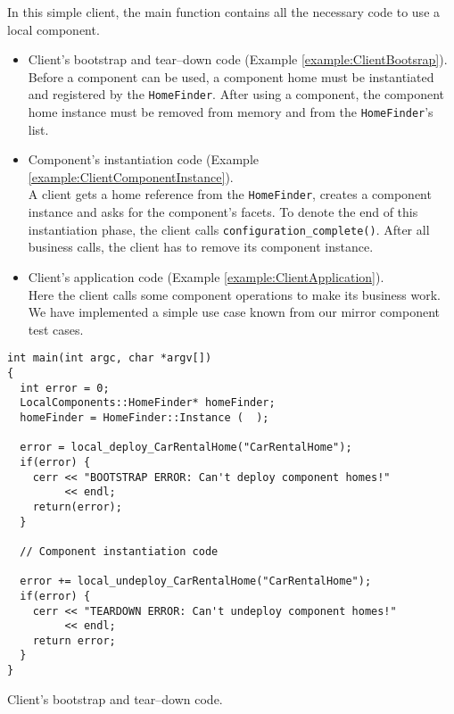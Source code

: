 In this simple client, the main function contains all the necessary code to use
a local component. 
\begin{itemize}
\item Client's bootstrap and tear--down code (Example \ref{example:ClientBootsrap}).\\
Before a component can be used, a component home must be instantiated and registered
by the {\tt HomeFinder}.
After using a component, the component home instance must be removed from memory and
from the {\tt HomeFinder}'s list.
\item Component's instantiation code (Example \ref{example:ClientComponentInstance}). \\
A client gets a home reference from the {\tt HomeFinder}, creates a component 
instance and asks for the component's facets.
To denote the end of this instantiation phase, the client calls {\tt configuration\_complete()}.
After all business calls, the client has to remove its component instance.

\item Client's application code (Example \ref{example:ClientApplication}). \\
Here the client calls some component operations to make its business work.
We have implemented a simple use case known from our mirror component test cases.
\end{itemize}

\begin{Example}
\begin{minifbox}
\begin{small}
\begin{verbatim}
int main(int argc, char *argv[])
{
  int error = 0;
  LocalComponents::HomeFinder* homeFinder;
  homeFinder = HomeFinder::Instance (  );

  error = local_deploy_CarRentalHome("CarRentalHome");
  if(error) {
    cerr << "BOOTSTRAP ERROR: Can't deploy component homes!" 
         << endl;
    return(error);
  }

  // Component instantiation code

  error += local_undeploy_CarRentalHome("CarRentalHome");
  if(error) {
    cerr << "TEARDOWN ERROR: Can't undeploy component homes!" 
         << endl;
    return error;
  }
}
\end{verbatim}
\end{small}
\end{minifbox}
\caption{Client's bootstrap and tear--down code.}
\label{example:ClientBootsrap}
\end{Example}

